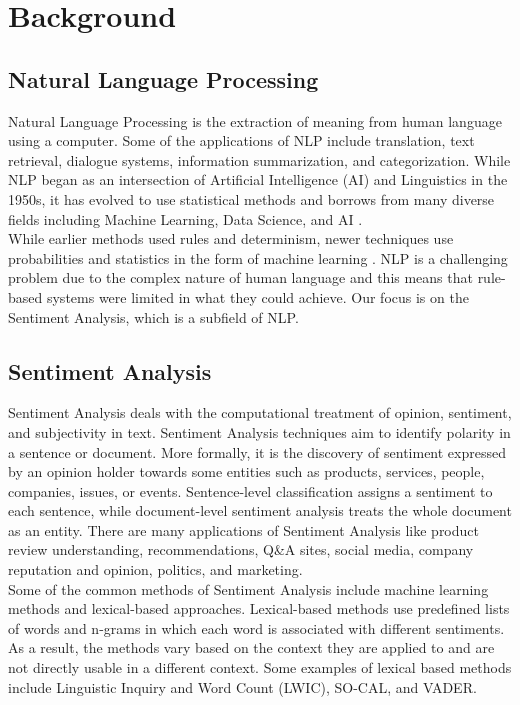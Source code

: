 \documentclass[conference]{IEEEtran}
\begin{document}
\section{Background}

\subsection{Natural Language Processing}
Natural Language Processing is the extraction of meaning from human language using a computer\cite{b7, b8}. Some of the applications of NLP include translation, text retrieval, dialogue systems, information summarization, and categorization\cite{b7}. While NLP began as an intersection of Artificial Intelligence (AI) and Linguistics in the 1950s, it has evolved to use statistical methods and borrows from many diverse fields including Machine Learning, Data Science, and AI \cite{b8}. \\

While earlier methods used  rules and determinism, newer techniques use probabilities and statistics in the form of machine learning \cite{b8}. NLP is a challenging problem due to the complex nature of human language and this means that rule-based systems were limited in what they could achieve. Our focus is on the Sentiment Analysis, which is a subfield of NLP. \\

\subsection{Sentiment Analysis}
Sentiment Analysis deals with the computational treatment of opinion, sentiment, and subjectivity in text. Sentiment Analysis techniques aim to identify polarity in a sentence or document. More formally, it is the discovery of sentiment expressed by an opinion holder towards some entities such as products, services, people, companies, issues, or events. Sentence-level classification assigns a sentiment to each sentence, while document-level sentiment analysis treats the whole document as an entity. There are many applications of Sentiment Analysis like product review understanding, recommendations, Q\&A sites, social media, company reputation and opinion, politics, and marketing. \cite{b10, b13, b19}\\

Some of the common methods of Sentiment Analysis include machine learning methods and lexical-based approaches. Lexical-based methods use predefined lists of words and n-grams in which each word is associated with different sentiments. As a result, the methods vary based on the context they are applied to and are not directly usable in a different context. Some examples of lexical based methods include Linguistic Inquiry and Word Count (LWIC), SO-CAL, and VADER.\cite{b11, b13}\\
\end{document}
